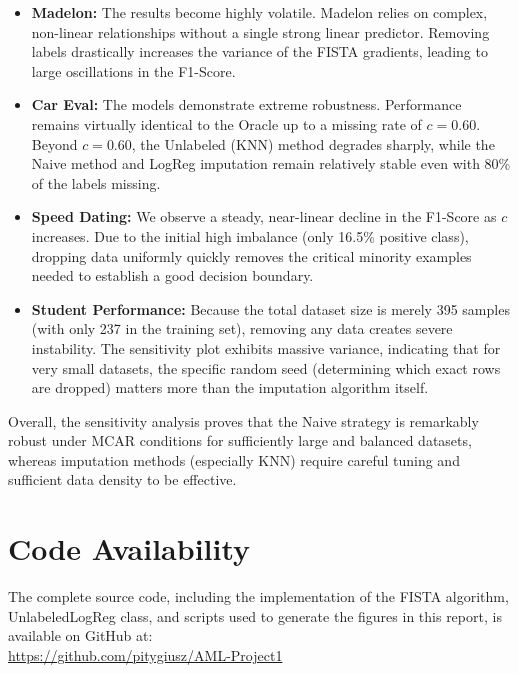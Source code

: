 \documentclass[12pt,a4paper]{article}
\begin{document}
\begin{itemize}

    \item \textbf{Madelon:} The results become highly volatile. Madelon relies on complex, non-linear relationships without a single strong linear predictor. Removing labels drastically increases the variance of the FISTA gradients, leading to large oscillations in the F1-Score.
    
    \item \textbf{Car Eval:} The models demonstrate extreme robustness. Performance remains virtually identical to the Oracle up to a missing rate of $c=0.60$. Beyond $c=0.60$, the Unlabeled (KNN) method degrades sharply, while the Naive method and LogReg imputation remain relatively stable even with 80\% of the labels missing.
    
    \item \textbf{Speed Dating:} We observe a steady, near-linear decline in the F1-Score as $c$ increases. Due to the initial high imbalance (only 16.5\% positive class), dropping data uniformly quickly removes the critical minority examples needed to establish a good decision boundary.
    

    
    \item \textbf{Student Performance:} Because the total dataset size is merely 395 samples (with only 237 in the training set), removing any data creates severe instability. The sensitivity plot exhibits massive variance, indicating that for very small datasets, the specific random seed (determining which exact rows are dropped) matters more than the imputation algorithm itself.
\end{itemize}

Overall, the sensitivity analysis proves that the Naive strategy is remarkably robust under MCAR conditions for sufficiently large and balanced datasets, whereas imputation methods (especially KNN) require careful tuning and sufficient data density to be effective.

\section{Code Availability}
The complete source code, including the implementation of the FISTA algorithm, UnlabeledLogReg class, and scripts used to generate the figures in this report, is available on GitHub at: \\
\url{https://github.com/pitygiusz/AML-Project1}
\end{document}
